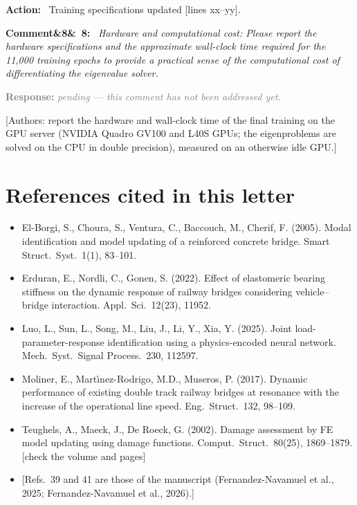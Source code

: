 \documentclass[11pt]{article}
\newenvironment{rcomment}[1]{\par\bigskip\noindent\textbf{Comment\ifx&#1&\else\ #1\fi:}\ \itshape}{\par}
\newenvironment{action}{\par\smallskip\noindent\color{resp}\textbf{Action:}\ }{\par}
\newcommand{\pending}{\par\smallskip\noindent\textcolor{gray}{\textbf{Response:} \textit{pending --- this comment
has not been addressed yet.}}\par}
\newcommand{\authornote}[1]{\textcolor{note}{\textsf{[Authors: #1]}}}
\newcommand{\tbd}[1]{\textcolor{note}{\textsf{[#1]}}}
\newcommand{\lines}[1]{\tbd{lines #1}}
\begin{document}
\begin{action}
Training specifications updated \lines{xx--yy}.
\end{action}

\begin{rcomment}{8}
Hardware and computational cost: Please report the hardware specifications and the approximate wall-clock time
required for the 11,000 training epochs to provide a practical sense of the computational cost of differentiating the
eigenvalue solver.
\end{rcomment}
\pending
\authornote{report the hardware and wall-clock time of the final training on the GPU server (NVIDIA Quadro GV100 and L40S GPUs; the eigenproblems are solved on the CPU in double precision), measured on an otherwise idle GPU.}

\section{References cited in this letter}
{\small
\begin{itemize}[leftmargin=*,label={}]
\item El-Borgi, S., Choura, S., Ventura, C., Baccouch, M., Cherif, F. (2005). Modal identification and model updating of a reinforced concrete bridge. Smart Struct.\ Syst.\ 1(1), 83--101.
\item Erduran, E., Nordli, C., Gonen, S. (2022). Effect of elastomeric bearing stiffness on the dynamic response of railway bridges considering vehicle--bridge interaction. Appl.\ Sci.\ 12(23), 11952.
\item Luo, L., Sun, L., Song, M., Liu, J., Li, Y., Xia, Y. (2025). Joint load-parameter-response identification using a physics-encoded neural network. Mech.\ Syst.\ Signal Process.\ 230, 112597.
\item Moliner, E., Mart\'{\i}nez-Rodrigo, M.D., Museros, P. (2017). Dynamic performance of existing double track railway bridges at resonance with the increase of the operational line speed. Eng.\ Struct.\ 132, 98--109.
\item Teughels, A., Maeck, J., De Roeck, G. (2002). Damage assessment by FE model updating using damage functions. Comput.\ Struct.\ 80(25), 1869--1879. \tbd{check the volume and pages}
\item \tbd{Refs.~39 and 41 are those of the manuscript (Fernandez-Navamuel et al., 2025; Fernandez-Navamuel et al., 2026).}
\end{itemize}
\vspace{-\baselineskip}
\renewcommand{\bibsection}{}
\setlength{\bibsep}{0.3ex}


}
\end{document}

